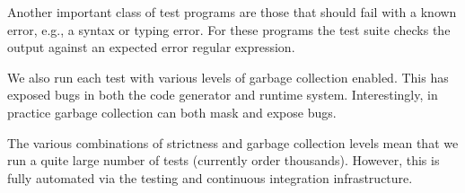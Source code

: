 \documentclass{llncs}
\begin{document}
Another important class of test programs are those that should fail with a
known error, e.g., a syntax or typing error.  For these programs the test
suite checks the output against an expected error regular expression. 

We also run each test with various levels of garbage collection enabled. This
has exposed bugs in both the code generator and runtime system.
Interestingly, in practice garbage collection can both mask and expose bugs.

The various combinations of strictness and garbage collection levels mean that
we run a quite large number of tests (currently order thousands). However,
this is fully automated via the testing and continuous integration
infrastructure.





\end{document}
